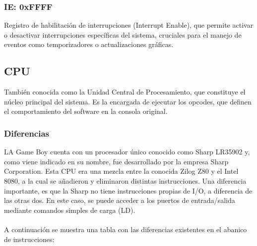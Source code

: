 \subsubsection{IE: 0xFFFF}
Registro de habilitación de interrupciones (Interrupt Enable), que permite activar o desactivar interrupciones específicas del sistema, cruciales para el manejo de eventos como temporizadores o actualizaciones gráficas.

\subsection{CPU}

También conocida como la Unidad Central de Procesamiento, que constituye el núcleo principal del sistema. Es la encargada de ejecutar los opcodes, que definen el comportamiento del software en la consola original.

\subsubsection{Diferencias}

LA Game Boy cuenta con un procesador único conocido como Sharp LR35902 y, como viene indicado en su nombre, fue desarrollado por la empresa Sharp Corporation. Esta CPU era una mezcla entre la conocida Zilog Z80 y el Intel 8080, a la cual se añadieron y eliminaron distintas instrucciones. Una diferencia importante, es que la Sharp no tiene instrucciones propias de I/O, a diferencia de las otras dos. En este caso, se puede acceder a los puertos de entrada/salida mediante comandos simples de carga (LD).
\\\\
A continuación se muestra una tabla con las diferencias existentes en el abanico de instrucciones:

